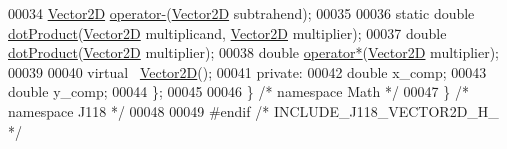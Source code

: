 \begin{DoxyCode}
00034     \hyperlink{class_j118_1_1_math_1_1_vector2_d}{Vector2D} \hyperlink{class_j118_1_1_math_1_1_vector2_d_a28749361a623b6f16ec5308085f6d164}{operator-}(\hyperlink{class_j118_1_1_math_1_1_vector2_d}{Vector2D} subtrahend);
00035 
00036     \textcolor{keyword}{static} \textcolor{keywordtype}{double} \hyperlink{class_j118_1_1_math_1_1_vector2_d_a6523e255345a0aec99581b1cc92a5f09}{dotProduct}(\hyperlink{class_j118_1_1_math_1_1_vector2_d}{Vector2D} multiplicand, \hyperlink{class_j118_1_1_math_1_1_vector2_d}{Vector2D} multiplier);
00037     \textcolor{keywordtype}{double} \hyperlink{class_j118_1_1_math_1_1_vector2_d_a6523e255345a0aec99581b1cc92a5f09}{dotProduct}(\hyperlink{class_j118_1_1_math_1_1_vector2_d}{Vector2D} multiplier);
00038     \textcolor{keywordtype}{double} \hyperlink{class_j118_1_1_math_1_1_vector2_d_a1de08c41ec31eda4a11e5c080f83c89f}{operator*}(\hyperlink{class_j118_1_1_math_1_1_vector2_d}{Vector2D} multiplier);
00039 
00040     \textcolor{keyword}{virtual} ~\hyperlink{class_j118_1_1_math_1_1_vector2_d}{Vector2D}();
00041 \textcolor{keyword}{private}:
00042     \textcolor{keywordtype}{double} x\_comp;
00043     \textcolor{keywordtype}{double} y\_comp;
00044 \};
00045 
00046 \} \textcolor{comment}{/* namespace Math */}
00047 \} \textcolor{comment}{/* namespace J118 */}
00048 
00049 \textcolor{preprocessor}{#endif }\textcolor{comment}{/* INCLUDE\_J118\_VECTOR2D\_H\_ */}\textcolor{preprocessor}{}
\end{DoxyCode}
